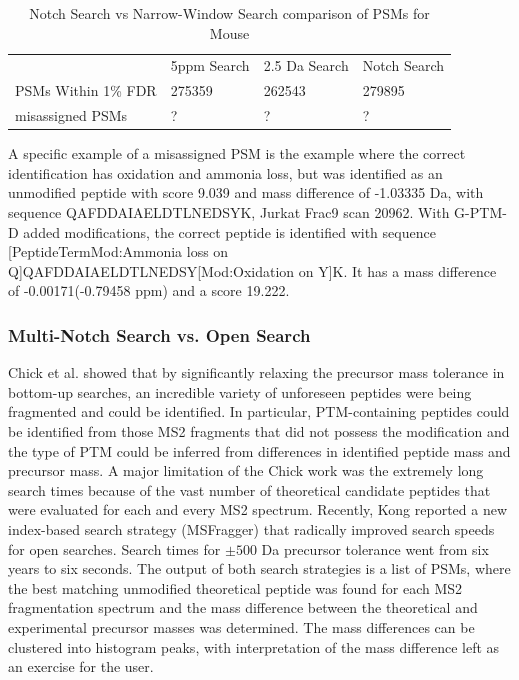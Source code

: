 \documentclass[journal=jprobs,manuscript=article]{achemso}
\begin{document}
\begin{table}[]
\centering
\caption{Notch Search vs Narrow-Window Search comparison of PSMs for Mouse}
\label{tbl:singleVsMultiNotch}
\begin{tabular}{llll}
                    & 5ppm Search & 2.5 Da Search & Notch Search \\
PSMs Within 1\% FDR & 275359      & 262543        & 279895       \\
misassigned PSMs    & ?           & ?          & ?            \\
\end{tabular}
\end{table}

A specific example of a misassigned PSM is the example where the correct identification has oxidation and ammonia loss, but was identified as an unmodified peptide with score 9.039 and mass difference of -1.03335 Da, with sequence QAFDDAIAELDTLNEDSYK, Jurkat Frac9 scan 20962.
With G-PTM-D added modifications, the correct peptide is identified with sequence [PeptideTermMod:Ammonia loss on Q]QAFDDAIAELDTLNEDSY[Mod:Oxidation on Y]K. It has a mass difference of -0.00171(-0.79458 ppm) and a score 19.222.

\newpage

\subsubsection{Multi-Notch Search vs. Open Search}

Chick et al. showed that by significantly relaxing the precursor mass tolerance in bottom-up searches, an incredible variety of unforeseen peptides were being fragmented and could be identified\citep{Chick_2015}.
In particular, PTM-containing peptides could be identified from those MS2 fragments that did not possess the modification and the type of PTM could be inferred from differences in identified peptide mass and precursor mass.
A major limitation of the Chick work was the extremely long search times because of the vast number of theoretical candidate peptides that were evaluated for each and every MS2 spectrum.
Recently, Kong\citep{Kong_2017} reported a new index-based search strategy (MSFragger) that radically improved search speeds for open searches.
Search times for $\pm 500$ Da precursor tolerance went from six years to six seconds.
The output of both search strategies is a list of PSMs, where the best matching unmodified theoretical peptide was found for each MS2 fragmentation spectrum and the mass difference between the theoretical and experimental precursor masses was determined.
The mass differences can be clustered into histogram peaks\citep{Rodriguez_2014}, with interpretation of the mass difference left as an exercise for the user.
\end{document}

